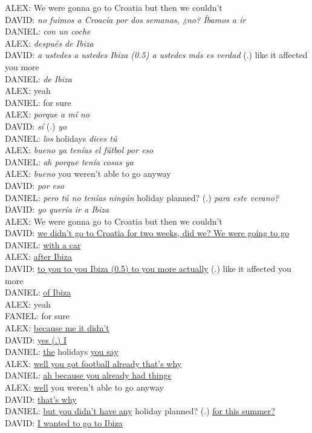 \documentclass[output=paper]{langscibook}
\begin{document}
\begin{exe}\ex\label{RG:ex12}
ALEX:  We were gonna go to Croatia but then we couldn’t\\
DAVID: \textit{no fuimos a Croacia por dos semanas, ¿no? Íbamos a ir} \\
DANIEL: \textit{con un coche}\\
ALEX: \textit{después de Ibiza}\\
DAVID: \textit{a ustedes a ustedes Ibiza (0.5) a ustedes más es verdad} (.) like it affected you more\\
DANIEL: \textit{de Ibiza}\\
ALEX: yeah\\
DANIEL: for sure\\
ALEX: \textit{porque a mí no}\\
DAVID: \textit{sí} (.) \textit{yo}\\
DANIEL: \textit{los} holidays \textit{dices tú}\\
ALEX: \textit{bueno ya tenías el fútbol por eso}\\
DANIEL: \textit{ah porque tenía cosas ya}\\
ALEX: \textit{bueno} you weren’t able to go anyway\\
DAVID: \textit{por eso}\\
DANIEL: \textit{pero tú no tenías ningún} holiday planned? (.) \textit{para este verano?}\\
DAVID: \textit{yo quería ir a Ibiza}\\

ALEX: We were gonna go to Croatia but then we couldn’t\\
DAVID: \ul{we didn’t go to Croatia for two weeks, did we? We were going to go}\\
DANIEL: \ul{with a car}\\
ALEX: \ul{after Ibiza}\\
DAVID: \ul{to you to you Ibiza (0.5) to you more actually} (.) like it affected you more\\
DANIEL: \ul{of Ibiza}\\
ALEX: yeah\\
FANIEL: for sure\\
ALEX: \ul{because me it didn’t}\\
DAVID: \ul{yes (.) I}\\
DANIEL: \ul{the} holidays \ul{you say}\\
ALEX: \ul{well you got football already that’s why}\\
DANIEL: \ul{ah because you already had things}\\
ALEX: \ul{well} you weren’t able to go anyway\\
DAVID: \ul{that’s why}\\
DANIEL: \ul{but you didn’t have any} holiday planned? (.) \ul{for this summer?}\\
DAVID: \ul{I wanted to go to Ibiza}
\end{exe}
\end{document}
